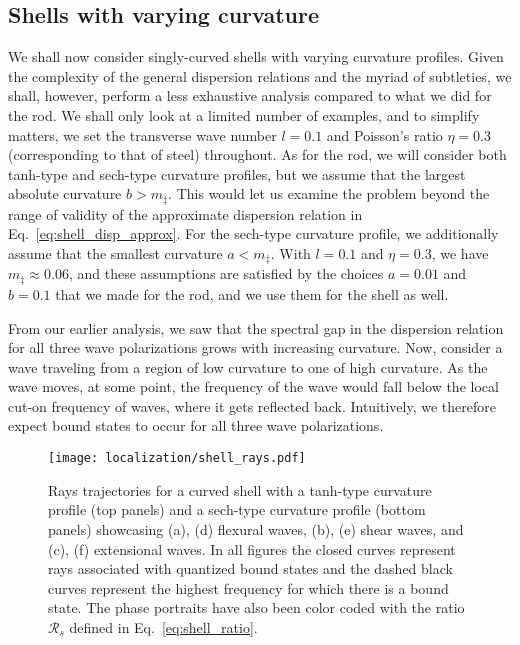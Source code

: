 \subsection{Shells with varying curvature}

We shall now consider singly-curved shells with varying curvature profiles.
Given the complexity of the general dispersion relations and the myriad of subtleties, we shall, however, perform a less exhaustive analysis compared to what we did for the rod.
We shall only look at a limited number of examples, and to simplify matters, we set the transverse wave number $l = 0.1$ and Poisson's ratio $\eta = 0.3$ (corresponding to that of steel) throughout.
As for the rod, we will consider both tanh-type and sech-type curvature profiles, but we assume that the largest absolute curvature $b > m_{\ddag}$.
This would let us examine the problem beyond the range of validity of the approximate dispersion relation in Eq.~\eqref{eq:shell_disp_approx}.
For the sech-type curvature profile, we additionally assume that the smallest curvature $a < m_{\ddag}$.
With $l = 0.1$ and $\eta = 0.3$, we have $m_{\ddag} \approx 0.06$, and these assumptions are satisfied by the choices $a = 0.01$ and $b = 0.1$ that we made for the rod, and we use them for the shell as well.

From our earlier analysis, we saw that the spectral gap in the dispersion relation for all three wave polarizations grows with increasing curvature.
Now, consider a wave traveling from a region of low curvature to one of high curvature.
As the wave moves, at some point, the frequency of the wave would fall below the local cut-on frequency of waves, where it gets reflected back.
Intuitively, we therefore expect bound states to occur for all three wave polarizations.
%
\begin{figure}
  \begin{center}
    \texttt{[image: localization/shell\_rays.pdf]}
  \end{center}
  \caption{%
    Rays trajectories for a curved shell with a tanh-type curvature profile (top panels) and a sech-type curvature profile (bottom panels) showcasing (a), (d) flexural waves, (b), (e) shear waves, and (c), (f) extensional waves.
    In all figures the closed curves represent rays associated with quantized bound states and the dashed black curves represent the highest frequency for which there is a bound state.
    The phase portraits have also been color coded with the ratio $\mathscr{R}_{s}$ defined in Eq.~\eqref{eq:shell_ratio}.
  }
  \label{fig:shell_rays}
\end{figure}

